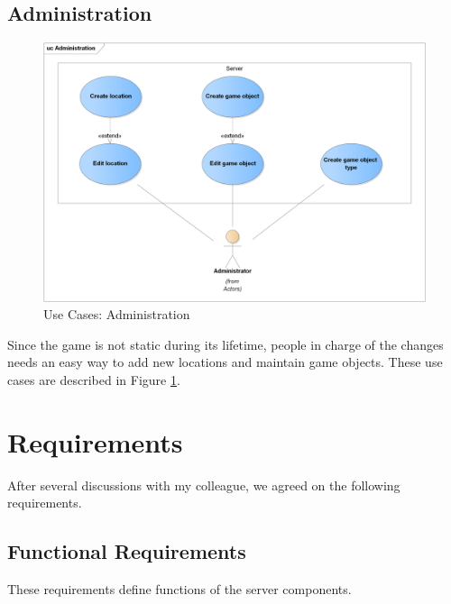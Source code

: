 	\subsection{Administration}
	\begin{figure}[h]	
		\includegraphics[width=\textwidth]{figures/UC_Administration}
		\centering			
		\caption{Use Cases: Administration}
		\label{fig:ucadmin}				
	\end{figure}	
	\noindent Since the game is not static during its lifetime, people in charge of the changes needs an easy way to add new locations and maintain game objects. These use cases are described in Figure \ref{fig:ucadmin}.
	
	
\section{Requirements}
\label{section:requirements}
After several discussions with my colleague, we agreed on the following requirements.

	\subsection{Functional Requirements}
	These requirements define functions of the server components.
